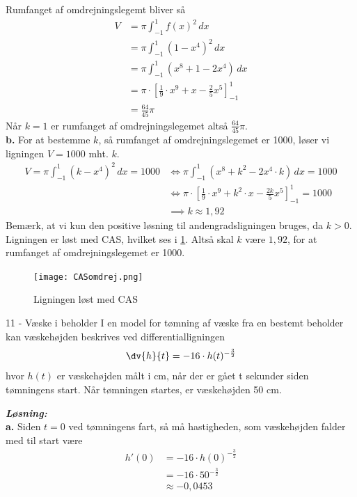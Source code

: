 \documentclass{article}
\newcommand{\sol}{\setlength{\parindent}{0cm}\textbf{\textit{Løsning:}}\setlength{\parindent}{1cm}}
\begin{document}
Rumfanget af omdrejningslegemt bliver så
\begin{equation*}
\begin{split}
  V&=\pi \int_{-1}^{1} f(x)^2 \,dx \\
  &= \pi \int_{-1}^{1} \left(1-x^4\right)^2 \,dx \\
  &=\pi \int_{-1}^{1} \left(x^8+1-2x^4\right)  \,dx \\
  &= \pi \cdot \left[\frac{1}{9} \cdot x^9 + x - \frac{2}{5} x^5\right]_{-1}^{1}\\
  &=\frac{64}{45} \pi 
\end{split}
\end{equation*}
Når $k=1$ er rumfanget af omdrejningslegemet altså $\frac{64}{45} \pi $.\\[1ex]
\textbf{b.}
For at bestemme $k$, så rumfanget af omdrejningslegemet er 1000, løser vi ligningen $V=1000$ mht. $k$. 
\begin{equation*}
\begin{split}
  V=\pi \int_{-1}^{1} \left(k-x^4\right) ^2 \,dx =1000 &\iff \pi \int_{-1}^{1} \left(x^8+k^2-2x^4 \cdot k\right)  \,dx=1000\\
  &\iff \pi \cdot \left[\frac{1}{9} \cdot x^9 + k^2 \cdot x - \frac{2k}{5} x^5\right]_{-1}^{1} =1000\\
  &\implies k \approx 1,92
\end{split}
\end{equation*}
Bemærk, at vi kun den positive løsning til andengradsligningen bruges, da $k>0$.
Ligningen er løst med CAS, hvilket ses i \cref{fig:CASomdrej}.
Altså skal $k$ være $1,92$, for at rumfanget af omdrejningslegemet er 1000. 
\begin{figure}[H]
\begin{center}
  \texttt{[image: CASomdrej.png]}
\end{center}
\caption{Ligningen løst med CAS}
\label{fig:CASomdrej}
\end{figure}
\begin{question*}{11 - Væske i beholder}{}
I en model for tømning af væske fra en bestemt beholder kan væskehøjden beskrives ved differentialligningen
\[
  \dv{h}{t}=-16 \cdot h(t)^{-\frac{3}{2}}
\] 
hvor $h(t)$ er væskehøjden målt i cm, når der er gået t sekunder siden tømningens start.
Når tømningen startes, er væskehøjden 50 cm.
\end{question*}
\sol \\
\textbf{a.}
Siden $t=0$ ved tømningens fart, så må hastigheden, som væskehøjden falder med til start være
\begin{equation*}
\begin{split}
  h'(0)&=-16 \cdot h(0) ^{-\frac{3}{2}}\\
  &=-16 \cdot 50 ^{-\frac{3}{2}}\\
  &\approx -0,0453
\end{split}
\end{equation*}
\end{document}
